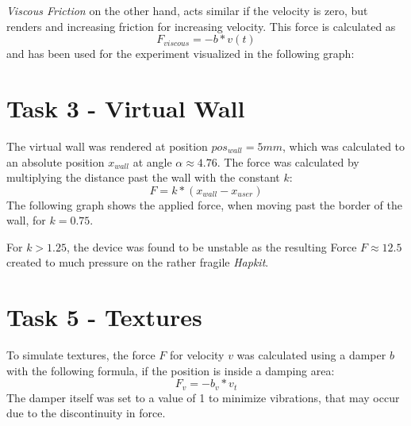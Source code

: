   \textit{Viscous Friction} on the other hand, acts similar if the velocity is zero, but renders and increasing friction for increasing velocity. This force is calculated as
  \begin{equation*}
    F_{viscous} = -b * v(t)
  \end{equation*}
  and has been used for the experiment visualized in the following graph:

  \section*{Task 3 - Virtual Wall}

  The virtual wall was rendered at position $pos_{wall} = 5mm$, which was calculated to an absolute position $x_{wall}$ at angle $\alpha \approx 4.76$. The force was calculated by multiplying the distance past the wall with the constant $k$:
  \begin{equation*}
    F = k * (x_{wall} - x_{user})
  \end{equation*}
  The following graph shows the applied force, when moving past the border of the wall, for $k = 0.75$.

  \begin{figure}[H]
    \centering
  \end{figure}

  For $k > 1.25$, the device was found to be unstable as the resulting Force $F \approx 12.5$ created to much pressure on the rather fragile \textit{Hapkit}.

  \section*{Task 5 - Textures}

  To simulate textures, the force $F$ for velocity $v$ was calculated using a damper $b$ with the following formula, if the position is inside a damping area:
  \begin{equation*}
    F_{v} = -b_{v} * v_{t}
  \end{equation*}
  The damper itself was set to a value of 1 to minimize vibrations, that may occur due to the discontinuity in force.

